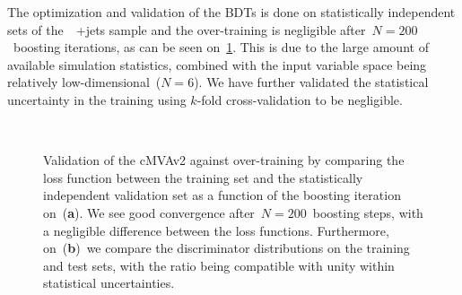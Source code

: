 The optimization and validation of the BDTs is done on statistically independent sets of the~\ttbar~+jets sample and the over-training is negligible after~$N=200$~boosting iterations, as can be seen on~\cref{fig:btag_loss}. This is due to the large amount of available simulation statistics, combined with the input variable space being relatively low-dimensional~($N=6$). We have further validated the statistical uncertainty in the training using $k$-fold cross-validation to be negligible.

\begin{figure}
\begin{centering}
 \\
\caption{Validation of the cMVAv2 against over-training by comparing the loss function between the training set and the statistically independent validation set as a function of the boosting iteration on~(\textbf{a}). We see good convergence after~$N=200$~boosting steps, with a negligible difference between the loss functions. Furthermore, on~(\textbf{b})~we compare the discriminator distributions on the training and test sets, with the ratio being compatible with unity within statistical uncertainties.}
\label{fig:btag_loss}
\end{centering}
\end{figure}

